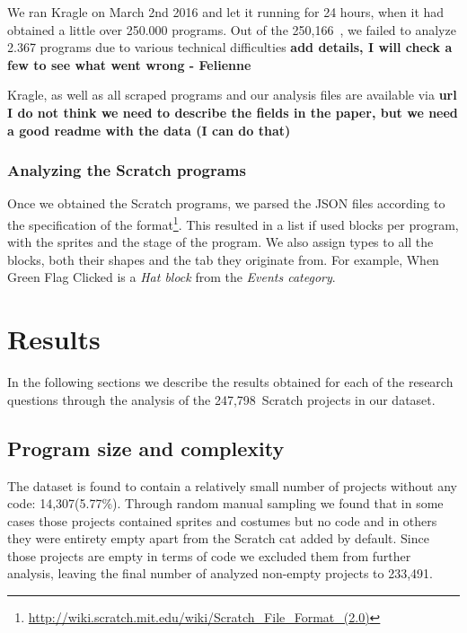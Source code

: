 \documentclass{sig-alternate}
\newcommand{\nPrograms}{250,166}
\newcommand{\nAnalyzedPrograms}{247,798}
\newcommand{\nemptyPrograms}{14,307}
\newcommand{\nScriptPrograms}{233,491}
\newcommand{\todo}[1]{\textbf{#1}}
\begin{document}

We ran Kragle on March 2nd 2016 and let it running for 24 hours, when it had obtained a little over 250.000 programs.  Out of the \nPrograms~, we failed to analyze 2.367 programs due to various technical difficulties \todo{add details, I will check a few to see what went wrong - Felienne} 

Kragle, as well as all scraped programs and our analysis files are available via \todo{url} \todo{I do not think we need to describe the fields in the paper, but we need a good readme with the data (I can do that)}

\subsubsection{Analyzing the Scratch programs}
Once we obtained the Scratch programs, we parsed the JSON files according to the specification of the format\footnote{\url{http://wiki.scratch.mit.edu/wiki/Scratch_File_Format_(2.0)}}. This resulted in a list if used blocks per program, with the sprites and the stage of the program. We also assign types to all the blocks, both their shapes and the tab they originate from. For example, When Green Flag Clicked is a \emph{Hat block} from the \emph{Events category}.


\section{Results}

In the following sections we describe the results obtained for each of the research questions through the analysis of the \nAnalyzedPrograms~Scratch projects in our dataset.

\subsection{Program size and complexity}

The dataset is found to contain a relatively small number of projects without any code: \nemptyPrograms (5.77\%). Through random manual sampling we found that in some cases those projects contained sprites and costumes but no code and in others they were entirety empty apart from the Scratch cat added by default. Since those projects are empty in terms of code we excluded them from further analysis, leaving the final number of analyzed non-empty projects to \nScriptPrograms.
\end{document}
